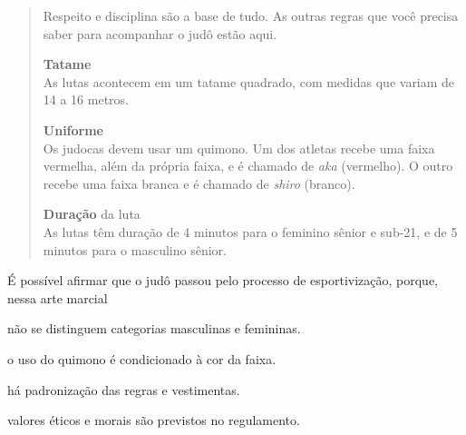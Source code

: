 \begin{quote}
Respeito e disciplina são a base de tudo. As outras regras que você
precisa saber para acompanhar o judô estão aqui.

\textbf{Tatame}\\
As lutas acontecem em um tatame quadrado, com medidas que variam de 14 a
16 metros.

\textbf{Uniforme}\\
Os judocas devem usar um quimono. Um dos atletas recebe uma faixa
vermelha, além da própria faixa, e é chamado de \textit{aka} (vermelho). O outro
recebe uma faixa branca e é chamado de \textit{shiro} (branco).

\textbf{Duração} da luta\\
As lutas têm duração de 4 minutos para o feminino sênior e sub-21, e de
5 minutos para o masculino sênior.

\end{quote}

É possível afirmar que o judô passou pelo processo de esportivização,
porque, nessa arte marcial 

\begin{escolha}
\item não se distinguem categorias masculinas e femininas. 

\item o uso do quimono é condicionado à cor da faixa.

\item há padronização das regras e vestimentas.

\item valores éticos e morais são previstos no regulamento.
\end{escolha}



